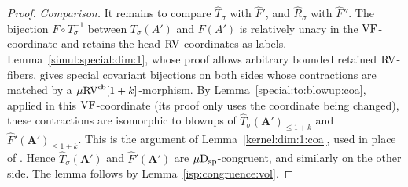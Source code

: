 \documentclass[12pt]{amsart}
\theoremstyle{plain}
\theoremstyle{definition}
\theoremstyle{remark}
\numberwithin{equation}{section}
\theoremstyle{plain}
\newcommand{\VF}{\textup{VF}}
\newcommand{\RV}{\textup{RV}}
\newcommand{\0}{\emptyset}
\newcommand{\mRV}{{\mu}{\RV}}
\newcommand{\dsp}{\textup{D}_{\textup{sp}}}
\newcommand{\mispdb}{\mu \dsp}
\DeclareMathOperator{\db}{d \! b}
\begin{document}
\begin{proof}
\emph{Comparison.} It remains to compare $\hat T_\sigma$ with $\hat F'$, and $\hat R_\sigma$ with $\hat F''$. The bijection $F \circ T_\sigma^{-1}$ between $T_\sigma(A')$ and $F(A')$ is relatively unary in the $\VF$-coordinate and retains the head $\RV$-coordinates as labels. Lemma~\ref{simul:special:dim:1}, whose proof allows arbitrary bounded retained $\RV$-fibers, gives special covariant bijections on both sides whose contractions are matched by a $\mRV^{\db}[1+k]$-morphism. By Lemma~\ref{special:to:blowup:coa}, applied in this $\VF$-coordinate (its proof only uses the coordinate being changed), these contractions are isomorphic to blowups of $\hat T_\sigma(\bm A')_{\leq 1+k}$ and $\hat F'(\bm A')_{\leq 1+k}$. This is the argument of Lemma~\ref{kernel:dim:1:coa}, used in place of \cite[Corollary~6.11]{Yin:int:acvf}. Hence $\hat T_\sigma(\bm A')$ and $\hat F'(\bm A')$ are $\mispdb$-congruent, and similarly on the other side. The lemma follows by Lemma~\ref{isp:congruence:vol}.
\end{proof}
\end{document}
